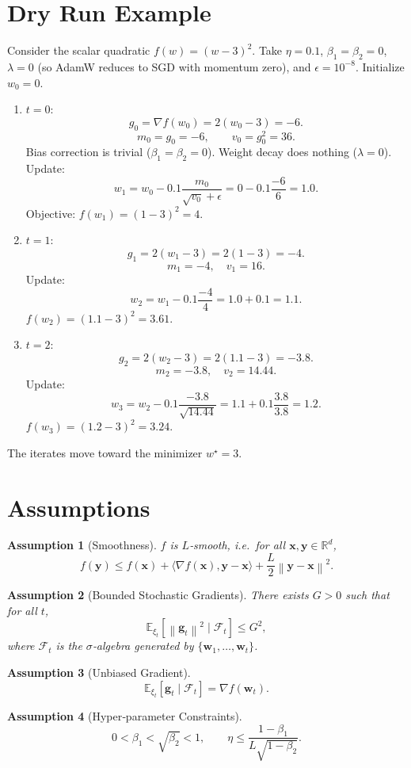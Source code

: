 \documentclass[11pt]{article}
\newtheorem{assumption}{Assumption}
\newcommand{\EE}{\mathbb{E}}
\newcommand{\RR}{\mathbb{R}}
\newcommand{\norm}[1]{\left\lVert #1 \right\rVert}
\newcommand{\ip}[2]{\langle #1,#2\rangle}
\begin{document}
\section*{Dry Run Example}
Consider the scalar quadratic $f(w)=(w-3)^2$.  
Take $\eta=0.1$, $\beta_1=\beta_2=0$, $\lambda=0$ (so AdamW reduces to SGD with momentum zero), and $\epsilon=10^{-8}$.  
Initialize $w_0=0$.

\begin{enumerate}[label=Iteration \arabic*:]
\item $t=0$:
    \[
    g_0 = \nabla f(w_0)=2(w_0-3)=-6.
    \]
    \[
    m_0 = g_0 = -6,\qquad v_0 = g_0^2=36.
    \]
    Bias correction is trivial ($\beta_1=\beta_2=0$).  
    Weight decay does nothing ($\lambda=0$).  
    Update:
    \[
    w_1 = w_0 - 0.1\frac{m_0}{\sqrt{v_0}+\epsilon}
        = 0 -0.1\frac{-6}{6}=1.0.
    \]
    Objective: $f(w_1)=(1-3)^2=4$.

\item $t=1$:
    \[
    g_1 = 2(w_1-3)=2(1-3)=-4.
    \]
    \[
    m_1 = -4,\quad v_1 = 16.
    \]
    Update:
    \[
    w_2 = w_1 -0.1\frac{-4}{4}=1.0+0.1=1.1.
    \]
    $f(w_2)=(1.1-3)^2=3.61$.

\item $t=2$:
    \[
    g_2 = 2(w_2-3)=2(1.1-3)=-3.8.
    \]
    \[
    m_2 = -3.8,\quad v_2 = 14.44.
    \]
    Update:
    \[
    w_3 = w_2 -0.1\frac{-3.8}{\sqrt{14.44}}=1.1+0.1\frac{3.8}{3.8}=1.2.
    \]
    $f(w_3)=(1.2-3)^2=3.24$.
\end{enumerate}
The iterates move toward the minimizer $w^\star=3$.

\section*{Assumptions}
\begin{assumption}[Smoothness]
\label{ass:smooth}
$f$ is $L$‑smooth, i.e.~for all $\bm{x},\bm{y}\in\RR^{d}$,
\[
f(\bm{y})\le f(\bm{x})+\ip{\nabla f(\bm{x})}{\bm{y}-\bm{x}}+\frac{L}{2}\norm{\bm{y}-\bm{x}}^{2}.
\]
\end{assumption}
\begin{assumption}[Bounded Stochastic Gradients]
\label{ass:bounded}
There exists $G>0$ such that for all $t$,
\[
\EE_{\xi_t}\!\left[\norm{\bm{g}_t}^{2}\mid \mathcal{F}_{t}\right]\le G^{2},
\]
where $\mathcal{F}_{t}$ is the $\sigma$‑algebra generated by $\{\bm{w}_1,\dots,\bm{w}_t\}$.
\end{assumption}
\begin{assumption}[Unbiased Gradient]
\label{ass:unbiased}
\[
\EE_{\xi_t}\!\left[\bm{g}_t\mid \mathcal{F}_{t}\right]=\nabla f(\bm{w}_t).
\]
\end{assumption}
\begin{assumption}[Hyper‑parameter Constraints]
\label{ass:hyper}
\[
0<\beta_1<\sqrt{\beta_2}<1,\qquad
\eta\le \frac{1-\beta_1}{L\sqrt{1-\beta_2}}.
\]
\end{assumption}
\end{document}
